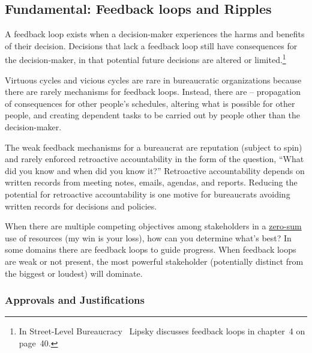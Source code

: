 \subsection*{Fundamental: Feedback loops and Ripples\label{sec:feedback-loop-and-ripples}}



A feedback loop exists when a decision-maker experiences the harms and benefits of their decision. Decisions that lack a feedback loop still have consequences for the decision-maker, in that potential future decisions are altered or limited.\footnote{In Street-Level Bureaucracy~\cite{1983_Lipsky} Lipsky discusses feedback loops in chapter~4 on page~40.}


Virtuous cycles and vicious cycles are rare in bureaucratic organizations because there are rarely mechanisms for feedback loops. 
Instead, there are \iftoggle{glossarysubstitutionworks}{\glspl{ripple}}{ripples} -- propagation of consequences for other people's schedules, 
altering what is possible for other people, and creating dependent tasks to be carried out by people other than the decision-maker.


The weak feedback mechanisms for a bureaucrat are reputation (subject to spin)
and rarely enforced retroactive accountability in the form of the question, ``What did you know and when did you know it?''
Retroactive accountability depends on written records from meeting notes, emails, agendas, and reports. Reducing the potential for retroactive accountability is one motive for bureaucrats avoiding written records for decisions and policies.

When there are multiple competing objectives among stakeholders in a 
\href{https://en.wikipedia.org/wiki/Zero-sum_game}{zero-sum}
\iftoggle{WPinmargin}{\marginpar{$>$Wikipedia: zero-sum game}}{}
use of resources (my win is your loss), how can you determine what's best? In some domains there are feedback loops to guide progress. When feedback loops are weak or not present,  the most powerful stakeholder (potentially distinct from the biggest or loudest) will dominate. 

\subsubsection*{Approvals and Justifications}

